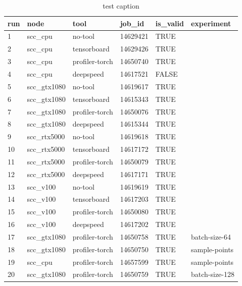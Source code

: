 \documentclass[12pt, a4paper, hidelinks]{article}
\begin{document}
\begin{table}[]
\label{tab:experiments-all}
\begin{tabular}{@{}llllll@{}}
\toprule
run & node         & tool           & job\_id  & is\_valid & experiment     \\ \midrule
1   & scc\_cpu     & no-tool        & 14629421 & TRUE      &                \\
2   & scc\_cpu     & tensorboard    & 14629426 & TRUE      &                \\
3   & scc\_cpu     & profiler-torch & 14650740 & TRUE      &                \\
4   & scc\_cpu     & deepspeed      & 14617521 & FALSE     &                \\
5   & scc\_gtx1080 & no-tool        & 14619617 & TRUE      &                \\
6   & scc\_gtx1080 & tensorboard    & 14615343 & TRUE      &                \\
7   & scc\_gtx1080 & profiler-torch & 14650076 & TRUE      &                \\
8   & scc\_gtx1080 & deepspeed      & 14615344 & TRUE      &                \\
9   & scc\_rtx5000 & no-tool        & 14619618 & TRUE      &                \\
10  & scc\_rtx5000 & tensorboard    & 14617172 & TRUE      &                \\
11  & scc\_rtx5000 & profiler-torch & 14650079 & TRUE      &                \\
12  & scc\_rtx5000 & deepspeed      & 14617171 & TRUE      &                \\
13  & scc\_v100    & no-tool        & 14619619 & TRUE      &                \\
14  & scc\_v100    & tensorboard    & 14617203 & TRUE      &                \\
15  & scc\_v100    & profiler-torch & 14650080 & TRUE      &                \\
16  & scc\_v100    & deepspeed      & 14617202 & TRUE      &                \\
17  & scc\_gtx1080 & profiler-torch & 14650758 & TRUE      & batch-size-64  \\
18  & scc\_gtx1080 & profiler-torch & 14650750 & TRUE      & sample-points  \\
19  & scc\_cpu     & profiler-torch & 14657599 & TRUE      & sample-points  \\
20  & scc\_gtx1080 & profiler-torch & 14650759 & TRUE      & batch-size-128 \\ \bottomrule
\end{tabular}
\caption{test caption}
\end{table}
\end{document}
